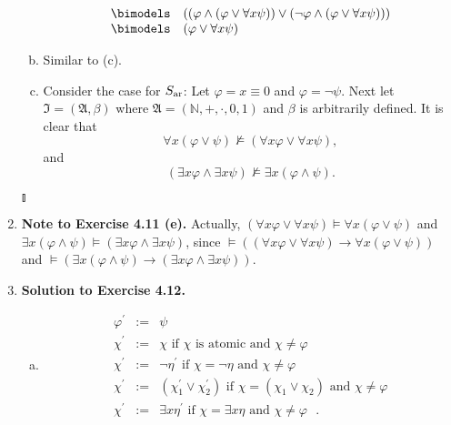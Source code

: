\begin{enumerate}[1.]
\begin{enumerate}[(a)]
\[\begin{array}{ll}
\bimodels & ((\varphi \land (\varphi \lor \forall x \psi)) \lor (\neg \varphi \land (\varphi \lor \forall x \psi))) \\
\bimodels & (\varphi \lor \forall x \psi)
\end{array}
\]
\item Similar to (c).
\item Consider the case for $S_{\mbox{\scriptsize ar}}$: Let $\varphi = x \equiv 0$ and $\varphi = \neg \psi$. Next let $\mathfrak{I} = ( \mathfrak{A}, \beta )$ where $\mathfrak{A} = ( \mathbb{N}, +, \cdot, 0, 1 )$ and $\beta$ is arbitrarily defined. It is clear that
\[
\forall x ( \varphi \lor \psi ) \not \models ( \forall x \varphi \lor \forall x \psi ),
\]
and
\[
( \exists x \varphi \land \exists x \psi ) \not \models \exists x ( \varphi \land \psi ).
\]
\end{enumerate} \begin{flushright}$\talloblong$\end{flushright}
%
\item \textbf{Note to Exercise 4.11 (e).} Actually, $( \forall x \varphi \lor \forall x \psi ) \models \forall x ( \varphi \lor \psi )$ and $\exists x ( \varphi \land \psi ) \models ( \exists x \varphi \land \exists x \psi )$, since $\models (( \forall x \varphi \lor \forall x \psi ) \rightarrow \forall x ( \varphi \lor \psi ))$ and $\models ( \exists x ( \varphi \land \psi ) \rightarrow ( \exists x \varphi \land \exists x \psi ) )$.
%
\item \textbf{Solution to Exercise 4.12.}
\begin{enumerate}[(a)]
\item 
\[
\begin{array}{lll}
\varphi^\prime & := & \psi \\
\chi^\prime & := & \chi \mbox{ if $\chi$ is atomic and $\chi \not = \varphi$ } \\
\chi^\prime & := & \neg \eta^\prime \mbox{ if $\chi = \neg \eta$ and $\chi \not = \varphi$} \\
\chi^\prime & := & ( \chi_1^\prime \lor \chi_2^\prime ) \mbox{ if $\chi = ( \chi_1 \lor \chi_2 )$ and $\chi \not = \varphi$} \\
\chi^\prime & := & \exists x \eta^\prime \mbox{ if $\chi = \exists x \eta$ and $\chi \not = \varphi$ }.
\end{array}
\]
\end{enumerate}
\end{enumerate}
